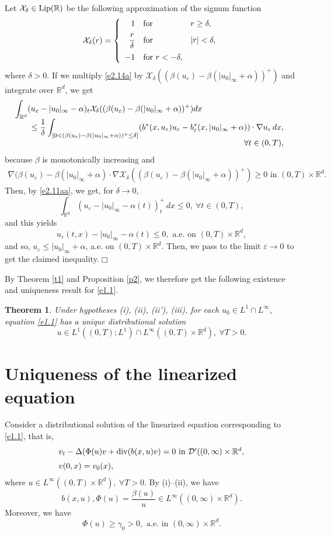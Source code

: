 \documentclass[12pt]{article}
\def\rrd{{\rr^d}}
\def\cald{{\mathcal{D}}}
\def\calx{{\mathcal{X}}}
\def\vsp{\vspace*{1,5mm}\\ }
\def\bk{\bigskip }
\def\dd{\displaystyle}
\def\D{{\Delta}}
\def\barr{\begin{array}}
\def\earr{\end{array}}
\def\D{{\Delta}}
\newtheorem{theorem}{Theorem}[section]
\theoremstyle{definition}
\def\vsp{\vspace*{2mm}\\ }
\def\calx{{\mathcal{X}}}
\def\rr{{\mathbb{R}}}
\def\9{{\infty}}
\def\a{{\alpha}}
\def\b{{\beta}}
\def\g{{\gamma}}
\def\D{{\Delta}}
\def\vp{{\varepsilon}}
\def\barr{\begin{array}}
\def\earr{\end{array}}
\def\dd{\displaystyle}
\def\bk{\bigskip }
\def\vsp{\vspace*{2mm}\\ }
\def\ff{\forall }
\begin{document}
Let $\calx_\delta\in{\rm Lip}(\rr)$ be the following approximation of the signum function
$$\calx_\delta(r)=\left\{\barr{rll}
1&\mbox{for }&r\ge\delta,\vsp 
\dd\frac r\delta&\mbox{for }&|r|<\delta,\vsp 
-1&\mbox{for }r<-\delta,\earr\right.$$where $\delta>0.$ If we multiply \eqref{e2.14a} by $\calx_\delta((\beta(u_\vp)-\beta(|u_0|_\9+\a))^+)$ and integrate over $\rrd$, we get
$$\!\!\!\barr{l}
\dd\int_{\rrd}(u_\vp-|u_0|_\9-\a)_t\calx_\delta((\beta(u_\vp)-\beta(|u_0|_\9+\a))^+)dx\\ 
\qquad\le\dd\frac1\delta
\int_{[0<(\beta(u_\vp)-\beta(|u_0|_\9+\a))^+\le\delta]}
(b^*(x,u_\vp)u_\vp-b^*_\vp(x,|u_0|_\9+\a))\cdot\nabla u_\vp\,dx,\\\hfill \ff t\in(0,T),\earr$$because $\beta$ is monotonically increasing and 
$$\barr{r}
\dd\nabla(\beta(u_\vp)-\beta(|u_0|_\9+\a)\cdot\nabla\calx_\delta
((\beta(u_\vp)-\beta(|u_0|_\9+\a))^+)\ge0\mbox{ in } (0,T)\times\rrd.\earr$$
 Then, by \eqref{e2.11aa}, we get, for $\delta\to0$,
$$\int_\rrd(u_\vp-|u_0|_\9-\a(t))^+_t\,dx\le0,\ \ff t\in(0,T),$$and this yields
$$u_\vp(t,x)-|u_0|_\9-\a(t)\le0,\mbox{ a.e. on }(0,T)\times\rrd,$$and so, $u_\vp\le|u_0|_\9+\a$, a.e. on $(0,T)\times\rrd$. Then, we pass to the limit $\vp\to0$ to get the claimed inequality.\hfill$\Box$\bk

By Theorem \ref{t1} and Proposition \ref{p2}, we therefore get the following existence and uniqueness result for \eqref{e1.1}.  

\begin{theorem}\label{t4} Under hypotheses {\rm(i), (ii), (ii'), (iii)}, for each $u_0\in L^1\cap L^\9$, equation \eqref{e1.1} has a unique distributional solution
\begin{equation}
\label{e2.12}
u\in L^1((0,T);L^1)\cap L^\9((0,T)\times\rrd),\ \ff T>0.
\end{equation}
\end{theorem}

\section{Uniqueness of the linearized equation}
\setcounter{equation}{0}

Consider a distributional solution of the linearized equation corresponding to \eqref{e1.1}, that is,
\begin{equation}
\label{e3.1}
\barr{l}
v_t-\D(\Phi(u)v+{\rm div}(b(x,u)v)=0\mbox{ in }\cald'((0,\9)\times\rrd,\vsp 
v(0,x)=v_0(x),\earr
\end{equation}
where $u\in L^\9((0,T)\times\rrd),\ \ff T>0$. By (i)--(ii), we have
$$b(x,u),\Phi(u)=\frac{\b(u)}{u}\in L^\9((0,\9)\times\rrd).$$Moreover, we have
\begin{equation}
\label{e3.2}
\Phi(u)\ge\g_0>0,\mbox{ a.e. in }(0,\9)\times\rrd.
\end{equation}
\end{document}
